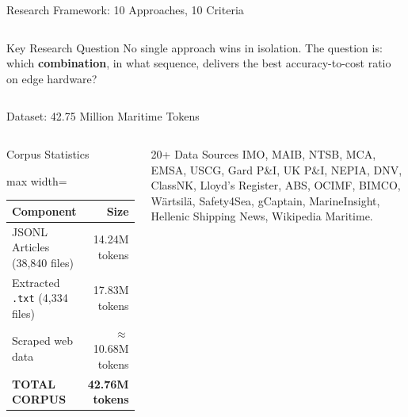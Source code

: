 \documentclass[aspectratio=169,11pt]{beamer}
\begin{document}
\begin{frame}{Research Framework: 10 Approaches, 10 Criteria}
\begin{columns}[T]
\vspace{4pt}
\begin{block}{Key Research Question}
  \scriptsize\RaggedRight
  No single approach wins in isolation.
  The question is: which \textbf{combination}, in what sequence, delivers
  the best accuracy-to-cost ratio on edge hardware?
\end{block}

\end{columns}
\end{frame}

\begin{frame}[shrink=15]{Dataset: 42.75 Million Maritime Tokens}
\begin{columns}[T]

\begin{block}{Corpus Statistics}
  \scriptsize
  \begin{adjustbox}{max width=\linewidth}
  \begin{tabular}{@{}lr@{}}
    \toprule
    \textbf{Component} & \textbf{Size}\\
    \midrule
    JSONL Articles (38,840 files) & 14.24M tokens\\
    Extracted \texttt{.txt} (4,334 files) & 17.83M tokens\\
    Scraped web data & $\approx$10.68M tokens\\
    \midrule
    \textbf{TOTAL CORPUS} & \textbf{42.76M tokens}\\
    \bottomrule
  \end{tabular}
  \end{adjustbox}
\end{block}

\begin{block}{20+ Data Sources}
  \scriptsize\RaggedRight
  IMO, MAIB, NTSB, MCA, EMSA, USCG, Gard P\&I, UK P\&I, NEPIA,
  DNV, ClassNK, Lloyd's Register, ABS, OCIMF, BIMCO, W\"artsil\"a,
  Safety4Sea, gCaptain, MarineInsight, Hellenic Shipping News,
  Wikipedia Maritime.
\end{block}



\end{columns}
\end{frame}
\end{document}

